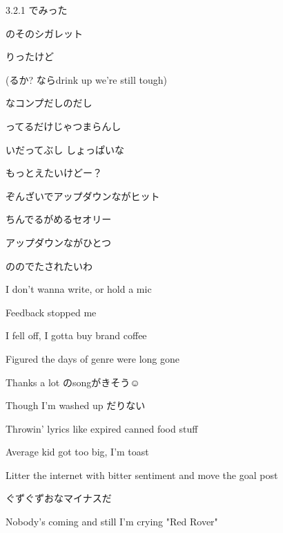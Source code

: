 \documentclass[a4paper,tate,twocolumn,12pt]{ltjtarticle}
\begin{document}
\begin{flushleft}
\begin{minipage}{\linewidth}
3.2.1 でみった

のそのシガレット

りったけど

(るか? ならdrink up we're still tough)

なコンプだしのだし

ってるだけじゃつまらんし

いだってぶし しょっぱいな

もっとえたいけどー？
\end{minipage}

\vspace{2em}

\noindent\begin{minipage}{\linewidth}
ぞんざいでアップダウンながヒット

ちんでるがめるセオリー

アップダウンながひとつ

ののでたされたいわ
\end{minipage}

\vspace{2em}

\noindent\begin{minipage}{\linewidth}
I don't wanna write, or hold a mic

Feedback stopped me

I fell off, I gotta buy brand coffee

Figured the days of genre were long gone

Thanks a lot のsongがきそう☺

Though I'm washed up だりない

Throwin' lyrics like expired canned food stuff

Average kid got too big, I'm toast

Litter the internet with bitter sentiment and move the goal post

ぐずぐずおなマイナスだ

Nobody's coming and still I'm crying "Red Rover"


\end{minipage}
\end{flushleft}
\end{document}
